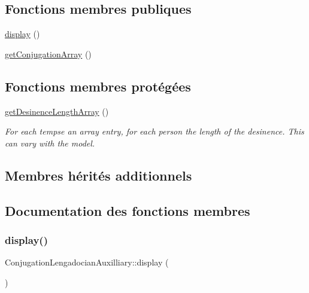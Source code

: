 \subsection*{Fonctions membres publiques}
\begin{DoxyCompactItemize}
\item 
\hyperlink{class_conjugation_lengadocian_auxilliary_a4edf29f1f54605fc5876ff675827672d}{display} ()
\item 
\hyperlink{class_conjugation_lengadocian_auxilliary_a19fa4af3fd6382641c641a6eebb9ad68}{get\+Conjugation\+Array} ()
\end{DoxyCompactItemize}
\subsection*{Fonctions membres protégées}
\begin{DoxyCompactItemize}
\item 
\hyperlink{class_conjugation_lengadocian_auxilliary_a931f205d57b485b89504d879cba60230}{get\+Desinence\+Length\+Array} ()
\begin{DoxyCompactList}\small\item\em For each tempse an array entry, for each person the length of the desinence. This can vary with the model. \end{DoxyCompactList}\end{DoxyCompactItemize}
\subsection*{Membres hérités additionnels}


\subsection{Documentation des fonctions membres}
\hypertarget{class_conjugation_lengadocian_auxilliary_a4edf29f1f54605fc5876ff675827672d}{}\label{class_conjugation_lengadocian_auxilliary_a4edf29f1f54605fc5876ff675827672d} 
\subsubsection{\texorpdfstring{display()}{display()}}
{\footnotesize\ttfamily Conjugation\+Lengadocian\+Auxilliary\+::display (\begin{DoxyParamCaption}{ }\end{DoxyParamCaption})}

